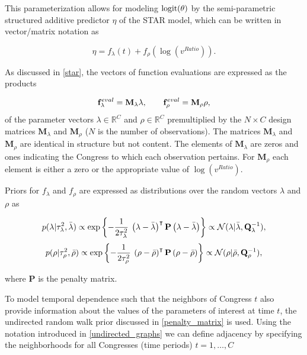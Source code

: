 This parameterization allows for modeling ${\rm logit}(\theta)$ by the semi-parametric structured 
additive predictor $\eta$ of the STAR model, which can be written in vector/matrix notation 
as 

\begin{equation*}
 \eta = f_\lambda(t) +  f_\rho(\log{(v^{Ratio})}). 
\end{equation*}

\noindent As discussed in \ref{star}, the vectors of function evaluations are 
expressed as the products 

\begin{equation*}
\mathbf{f}^{eval}_\lambda = \mathbf{M}_\lambda \lambda, 
\qquad 
\mathbf{f}^{eval}_\rho =  \mathbf{M}_\rho \rho, 
\end{equation*}
%
\noindent of the parameter vectors $\lambda \in \mathbb{R}^C$ and $\rho \in \mathbb{R}^C$ 
premultiplied by the $N \times C$ design matrices  $\mathbf{M}_\lambda$ and  $\mathbf{M}_\rho$ 
($N$ is the number of observations). The matrices $\mathbf{M}_\lambda$ and $\mathbf{M}_\rho$ 
are identical in structure but not content. The elements of $\mathbf{M}_\lambda$ are zeros and ones 
indicating the Congress to which each observation pertains. For $\mathbf{M}_\rho$ each element is 
either a zero or the appropriate value of $\log{(v^{Ratio})}$. 


Priors for $f_{\lambda}$ and $f_{\rho}$ are expressed as distributions over the random 
vectors $\lambda$ and $\rho$ as 

\begin{equation*}
p(\lambda | \tau_\lambda^2, \bar{\lambda}) 
\propto 
\exp{\left\{-\frac{1}{2\tau_\lambda^2} \: \left(\lambda - \bar{\lambda}\right)^\intercal  \mathbf{P}   
\left(\lambda - \bar{\lambda}\right) \right\}} 
\propto 
\mathcal{N} (\lambda | \bar{\lambda}, \mathbf{Q}_\lambda^{-1}), 
\end{equation*}
\begin{equation*}
p(\rho | \tau_\rho^2, \bar{\rho}) 
\propto 
\exp{\left\{-\frac{1}{2\tau_\rho^2} \: \left(\rho - \bar{\rho}\right)^\intercal  \mathbf{P} 
\left(\rho-\bar{\rho}\right) \right\}} 
\propto 
\mathcal{N} (\rho | \bar{\rho}, \mathbf{Q}_\rho^{-1}), 
\end{equation*}

\noindent where $\mathbf{P}$ is the penalty matrix.

To model temporal dependence such that the neighbors of Congress $t$ also provide 
information about the values of the parameters of interest at time $t$, the undirected 
random walk prior discussed in \ref{penalty_matrix} is used. Using the notation 
introduced in \ref{undirected_graphs} we can define adjacency by specifying the 
neighborhoods for all Congresses (time periods) $t = 1, \dots, C$

